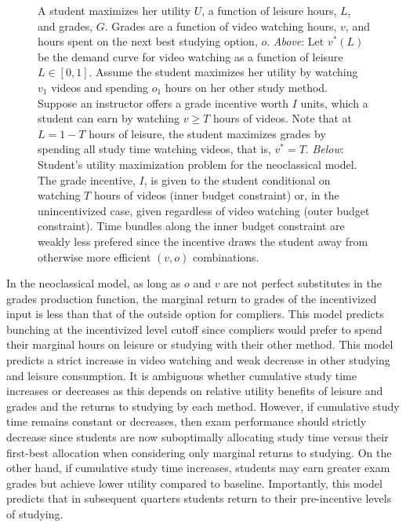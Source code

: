 \documentclass[12pt]{article}
\begin{document}
\begin{figure}
\begin{center}

		\caption{A student maximizes her utility $U$, a function of leisure hours, $L$, and grades, $G$. Grades are a function of video watching hours, $v$, and hours spent on the next best studying option, $o$. \textit{Above}: Let $v^*(L)$ be the demand curve for video watching as a function of leisure $L \in [0,1]$. Assume the student maximizes her utility by watching $v_1$ videos and spending $o_1$ hours on her other study method. Suppose an instructor offers a grade incentive worth $I$ units, which a student can earn by watching $v \geq T$ hours of videos. Note that at $L=1-T$ hours of leisure, the student maximizes grades by spending all study time watching videos, that is, $v^*=T$.
		\textit{Below}: Student's utility maximization problem for the neoclassical model. The grade incentive, $I$, is given to the student conditional on watching $T$ hours of videos (inner budget constraint) or, in the unincentivized case, given regardless of video watching (outer budget constraint). Time bundles along the inner budget constraint are weakly less prefered since the incentive draws the student away from otherwise more efficient $(v,o)$ combinations.}
	\end{center}
\end{figure}


In the neoclassical model, as long as $o$ and $v$ are not perfect substitutes in the grades production function, the marginal return to grades of the incentivized input is less than that of the outside option for compliers. This model predicts bunching at the incentivized level cutoff since compliers would prefer to spend their marginal hours on leisure or studying with their other method. This model predicts a strict increase in video watching and weak decrease in other studying and leisure consumption. It is ambiguous whether cumulative study time increases or decreases as this depends on relative utility benefits of leisure and grades and the returns to studying by each method. However, if cumulative study time remains constant or decreases, then exam performance should strictly decrease since students are now suboptimally allocating study time versus their first-best allocation when considering only marginal returns to studying. On the other hand, if cumulative study time increases, students may earn greater exam grades but achieve lower utility compared to baseline. Importantly, this model predicts that in subsequent quarters students return to their pre-incentive levels of studying.
\end{document}
